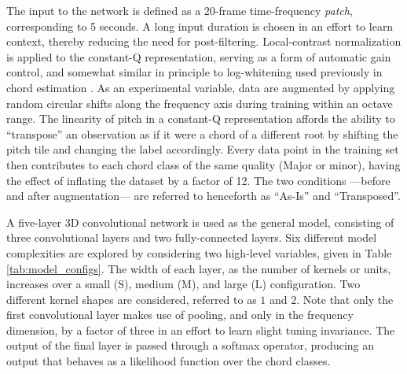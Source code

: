 The input to the network is defined as a 20-frame time-frequency \emph{patch}, corresponding to 5 seconds.
A long input duration is chosen in an effort to learn context, thereby reducing the need for post-filtering.
Local-contrast normalization is applied to the constant-Q representation, serving as a form of automatic gain control, and somewhat similar in principle to log-whitening used previously in chord estimation \cite{Cho2010Exploring}.
As an experimental variable, data are augmented by applying random circular shifts along the frequency axis during training within an octave range.
The linearity of pitch in a constant-Q representation affords the ability to ``transpose'' an observation as if it were a chord of a different root by shifting the pitch tile and changing the label accordingly.
Every data point in the training set then contributes to each chord class of the same quality (Major or minor), having the effect of inflating the dataset by a factor of 12.
The two conditions ---before and after augmentation--- are referred to henceforth as ``As-Is'' and ``Transposed''.

A five-layer 3D convolutional network is used as the general model, consisting of three convolutional layers and two fully-connected layers. %
Six different model complexities are explored by considering two high-level variables, given in Table \ref{tab:model_configs}.
The width of each layer, as the number of kernels or units, increases over a small (S), medium (M), and large (L) configuration.
Two different kernel shapes are considered, referred to as $1$ and $2$.
Note that only the first convolutional layer makes use of pooling, and only in the frequency dimension, by a factor of three in an effort to learn slight tuning invariance.
The output of the final layer is passed through a softmax operator, producing an output that behaves as a likelihood function over the chord classes.


